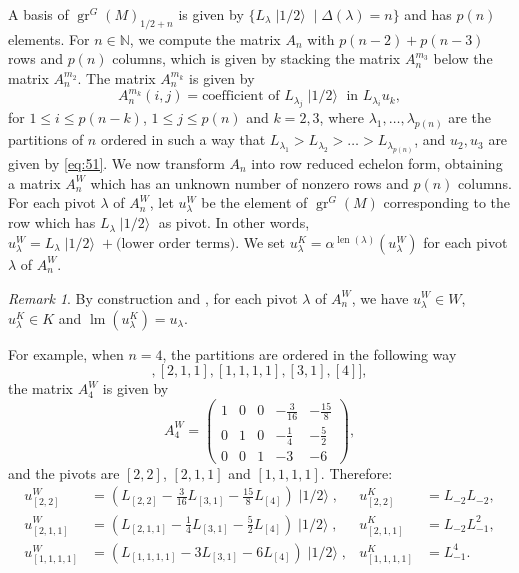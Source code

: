 \documentclass[a4paper, 12pt, reqno]{amsart}
\theoremstyle{remark}
\newtheorem{remark}[theorem]{Remark}
\DeclareMathOperator{\gr}{gr}
\DeclareMathOperator{\lm}{lm}
\DeclareMathOperator{\len}{len}
\DeclareMathOperator{\vachalf}{|1/2\rangle}
\begin{document}
A basis of $\gr^G(M)_{1/2 + n}$ is given by $\{L_{\lambda}\vachalf \mid \Delta(\lambda) = n\}$ and has $p(n)$ elements.
For $n \in \mathbb{N}$, we compute the matrix $A_n$ with $p(n - 2) + p(n - 3)$ rows and $p(n)$ columns, which is given by stacking the matrix $A^{m_3}_n$ below the matrix $A^{m_2}_n$.
The matrix $A^{m_k}_n$ is given by
\begin{equation*}
  A^{m_k}_n(i, j) = \text{coefficient of $L_{\lambda_j}\vachalf$ in $L_{\lambda_i}u_k$},
\end{equation*}
for $1 \le i \le p(n - k)$, $1 \le j \le p(n)$ and $k = 2, 3$, where $\lambda_1, \dots, \lambda_{p(n)}$ are the partitions of $n$ ordered in such a way that $L_{\lambda_1} > L_{\lambda_2} > \dots > L_{\lambda_{p(n)}}$, and $u_2, u_3$ are given by \eqref{eq:51}.
We now transform $A_n$ into row reduced echelon form, obtaining a matrix $A^W_n$ which has an unknown number of nonzero rows and $p(n)$ columns.
For each pivot $\lambda$ of $A^W_n$, let $u^W_{\lambda}$ be the element of $\gr^G(M)$ corresponding to the row which has $L_{\lambda}\vachalf$ as pivot.
In other words, $u^W_{\lambda} = L_{\lambda}\vachalf + \text{(lower order terms)}$.
We set $u^K_{\lambda} = \alpha^{\len(\lambda)}(u^W_{\lambda})$ for each pivot $\lambda$ of $A^W_n$.

\begin{remark}
  \label{rmk:50}
  By construction and , for each pivot $\lambda$ of $A^W_n$, we have $u^W_{\lambda} \in W$, $u^K_{\lambda} \in K$ and $\lm(u^K_{\lambda}) = u_{\lambda}$.
\end{remark}

For example, when $n = 4$, the partitions are ordered in the following way
\begin{equation*}
  [[2, 2], [2, 1, 1], [1, 1, 1, 1], [3, 1], [4]],
\end{equation*}
the matrix $A^W_4$ is given by
\begin{equation*}
  A^W_4=
  \begin{pmatrix}
    1 & 0 & 0 & -\frac{3}{16} & -\frac{15}{8} \\
    0 & 1 & 0 & -\frac{1}{4} & -\frac{5}{2} \\
    0 & 0 & 1 & -3 & -6
  \end{pmatrix},
\end{equation*}
and the pivots are $[2, 2]$, $[2, 1, 1]$ and $[1, 1, 1, 1]$.
Therefore:
\begin{align*}
  u^W_{[2, 2]} &= (L_{[2, 2]} - \tfrac{3}{16}L_{[3, 1]} - \tfrac{15}{8}L_{[4]})\vachalf, &u^K_{[2, 2]} &= L_{-2}L_{-2}, \\
  u^W_{[2, 1, 1]} &= (L_{[2, 1, 1]} - \tfrac{1}{4}L_{[3, 1]} - \tfrac{5}{2}L_{[4]})\vachalf, &u^K_{[2, 1, 1]} &= L_{-2}L_{-1}^2, \\
  u^W_{[1, 1, 1, 1]} &= (L_{[1, 1, 1, 1]} - 3L_{[3, 1]} - 6L_{[4]})\vachalf, &u^K_{[1, 1, 1, 1]} &= L_{-1}^4.
\end{align*}
\end{document}
